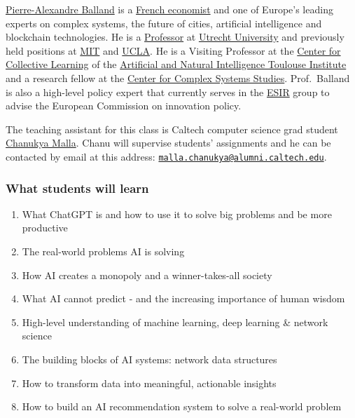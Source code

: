 \documentclass[
]{article}
\providecommand{\tightlist}{%
  \setlength{\itemsep}{0pt}\setlength{\parskip}{0pt}}
\begin{document}
\href{https://www.paballand.com/}{Pierre-Alexandre Balland} is a
\href{https://scholar.google.com/citations?user=ORZg_McAAAAJ\&hl=en\&oi=ao}{French
economist} and one of Europe's leading experts on complex systems, the
future of cities, artificial intelligence and blockchain technologies.
He is a \href{https://www.uu.nl/staff/PMABalland/Profile}{Professor} at
\href{https://www.uu.nl/en}{Utrecht University} and previously held
positions at
\href{https://www.media.mit.edu/people/balland/overview/}{MIT} and
\href{https://www.ucla.edu/}{UCLA}. He is a Visiting Professor at the
\href{https://centerforcollectivelearning.org/}{Center for Collective
Learning} of the \href{https://en.univ-toulouse.fr/aniti}{Artificial and
Natural Intelligence Toulouse Institute} and a research fellow at the
\href{https://www.uu.nl/en/research/centre-for-complex-systems-studies-ccss}{Center
for Complex Systems Studies}. Prof.~Balland is also a high-level policy
expert that currently serves in the
\href{https://ec.europa.eu/info/research-and-innovation/strategy/support-policy-making/support-eu-research-and-innovation-policy-making/esir_en}{ESIR}
group to advise the European Commission on innovation policy.

The teaching assistant for this class is Caltech computer science grad
student \href{malla.chanukya@alumni.caltech.edu}{Chanukya Malla}. Chanu
will supervise students' assignments and he can be contacted by email at
this address:
\href{mailto:malla.chanukya@alumni.caltech.edu}{\nolinkurl{malla.chanukya@alumni.caltech.edu}}.

\hypertarget{what-students-will-learn}{%
\subsubsection{What students will
learn}\label{what-students-will-learn}}

\begin{enumerate}
\def\labelenumi{\arabic{enumi}.}
\tightlist
\item
  What ChatGPT is and how to use it to solve big problems and be more
  productive\\
\item
  The real-world problems AI is solving\\
\item
  How AI creates a monopoly and a winner-takes-all society\\
\item
  What AI cannot predict - and the increasing importance of human
  wisdom\\
\item
  High-level understanding of machine learning, deep learning \& network
  science\\
\item
  The building blocks of AI systems: network data structures\\
\item
  How to transform data into meaningful, actionable insights\\
\item
  How to build an AI recommendation system to solve a real-world problem
\end{enumerate}
\end{document}
